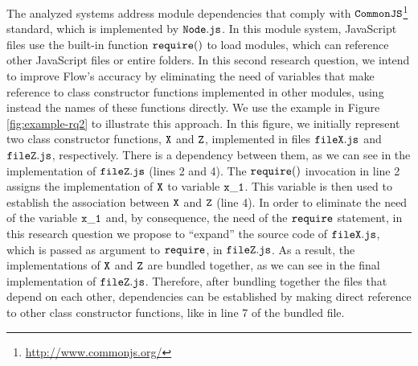 \documentclass[review]{elsarticle}
\newcommand{\aspas}[1]{{``#1''}}
\newcommand{\mcode}[1]{$\tt #1$}
\begin{document}
The analyzed systems address module dependencies that comply with \mcode{CommonJS}\footnote{\url{http://www.commonjs.org/}} standard, which is implemented by \mcode{Node.js}. In this module system, JavaScript files use the built-in function \mcode{require()} to load modules, which can reference other JavaScript files or entire folders. In this second research question, we intend to improve Flow's accuracy by eliminating the need of variables that make reference to class constructor functions implemented in other modules, using instead the names of these functions directly. We use the example in Figure \ref{fig:example-rq2} to illustrate this approach. In this figure, we initially represent two class constructor functions, \mcode{X} and \mcode{Z}, implemented in files \mcode{fileX.js} and \mcode{fileZ.js}, respectively. There is a dependency between them, as we can see in the implementation of \mcode{fileZ.js} (lines 2 and 4). The \mcode{require()} invocation in line 2 assigns the implementation of \mcode{X} to variable \mcode{x\_1}. This variable is then used to establish the association between \mcode{X} and \mcode{Z} (line 4). In order to eliminate the need of the variable \mcode{x\_1} and, by consequence, the need of the \mcode{require} statement, in this research question we propose to \aspas{expand} the source code of \mcode{fileX.js}, which is passed as argument to \mcode{require}, in \mcode{fileZ.js}. As a result, the implementations of \mcode{X} and \mcode{Z} are bundled together, as we can see in the final implementation of \mcode{fileZ.js}. Therefore, after bundling together the files that depend on each other, dependencies can be established by making direct reference to other class constructor functions, like in line 7 of the bundled file. 
\end{document}
